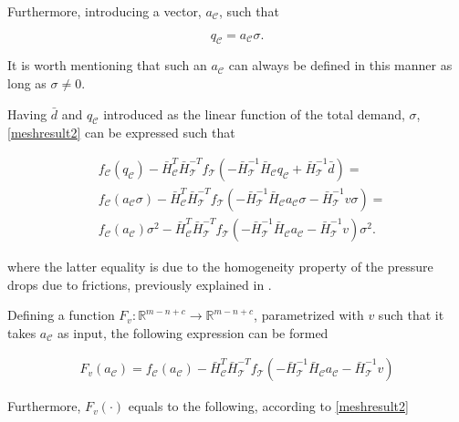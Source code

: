 Furthermore, introducing a vector, $a_{\mathcal{C}}$, such that 

\begin{equation}
\label{ac}
q_{\mathcal{C}} = a_{\mathcal{C}} \sigma.
\end{equation}

It is worth mentioning that such an $a_{\mathcal{C}}$ can always be defined in this manner as long as $\sigma \neq 0$.

Having $\bar{d}$ and $q_{\mathcal{C}}$ introduced as the linear function of the total demand, $\sigma$, \eqref{meshresult2} can be expressed such that

\begin{equation}
\begin{split}
\label{meshresult3}
& f_{\mathcal{C}}(q_\mathcal{C}) -\bar{H}^T_{\mathcal{C}}\bar{H}^{-T}_{\mathcal{T}} f_{\mathcal{T}}(-\bar{H}^{-1}_{\mathcal{T}} \bar{H}_{\mathcal{C}} q_\mathcal{C} + \bar{H}^{-1}_{\mathcal{T}} \bar{d}) = \\
& f_{\mathcal{C}}(a_{\mathcal{C}} \sigma) -\bar{H}^T_{\mathcal{C}}\bar{H}^{-T}_{\mathcal{T}} f_{\mathcal{T}}(-\bar{H}^{-1}_{\mathcal{T}} \bar{H}_{\mathcal{C}} a_{\mathcal{C}} \sigma - \bar{H}^{-1}_{\mathcal{T}} v \sigma) = \\
& f_{\mathcal{C}}(a_{\mathcal{C}})\sigma^2 -\bar{H}^T_{\mathcal{C}}\bar{H}^{-T}_{\mathcal{T}} f_{\mathcal{T}}(-\bar{H}^{-1}_{\mathcal{T}} \bar{H}_{\mathcal{C}} a_{\mathcal{C}} - \bar{H}^{-1}_{\mathcal{T}} v) \sigma^2.
\end{split}
\end{equation} 

where the latter equality is due to the homogeneity property of the pressure drops due to frictions, previously explained in .

Defining a function $F_v : \mathbb{R}^{m-n+c} \rightarrow \mathbb{R}^{m-n+c}$, parametrized with $v$ such that it takes $a_{\mathcal{C}}$ as input, the following expression can be formed

\begin{equation}
\begin{split}
\label{Fv}
F_v(a_{\mathcal{C}}) = f_{\mathcal{C}}(a_{\mathcal{C}}) -\bar{H}^T_{\mathcal{C}}\bar{H}^{-T}_{\mathcal{T}} f_{\mathcal{T}}(-\bar{H}^{-1}_{\mathcal{T}} \bar{H}_{\mathcal{C}} a_{\mathcal{C}} - \bar{H}^{-1}_{\mathcal{T}} v) 
\end{split}
\end{equation}

Furthermore, $F_v(\cdot)$ equals to the following, according to \eqref{meshresult2}

